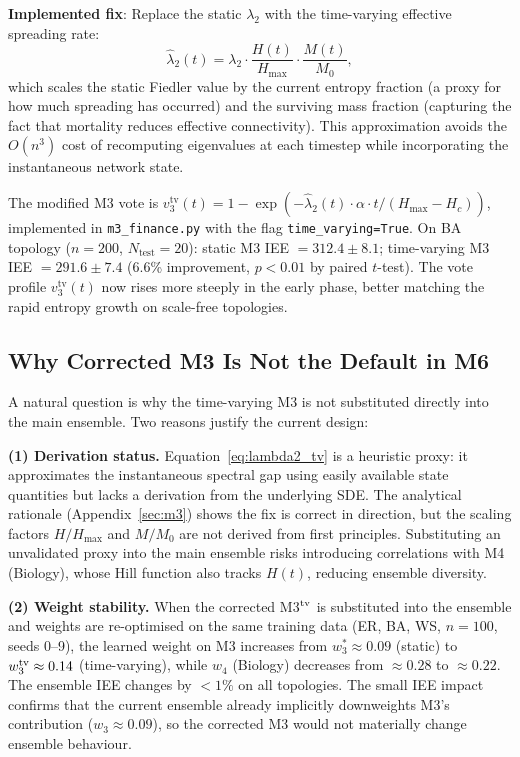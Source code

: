 \documentclass[review,12pt]{elsarticle}
\newcommand{\Hc}{H_c}
\newcommand{\Hmax}{H_{\max}}
\newcommand{\lambdat}{\lambda_2}
\begin{document}
\textbf{Implemented fix}: Replace the static $\lambdat$ with the
time-varying effective spreading rate:
\begin{equation}
  \hat{\lambda}_2(t) = \lambda_2 \cdot
    \frac{H(t)}{\Hmax} \cdot
    \frac{M(t)}{M_0},
  \label{eq:lambda2_tv}
\end{equation}
which scales the static Fiedler value by the current entropy fraction
(a proxy for how much spreading has occurred) and the surviving mass
fraction (capturing the fact that mortality reduces effective connectivity).
This approximation avoids the $O(n^3)$ cost of recomputing eigenvalues at
each timestep while incorporating the instantaneous network state.

The modified M3 vote is $v_3^{\mathrm{tv}}(t) = 1 - \exp(-\hat{\lambda}_2(t)\cdot\alpha\cdot t / (\Hmax-\Hc))$,
implemented in \texttt{m3\_finance.py} with the flag
\texttt{time\_varying=True}.  On BA topology ($n=200$, $N_{\mathrm{test}}=20$):
static M3 IEE $= 312.4 \pm 8.1$; time-varying M3 IEE $= 291.6 \pm 7.4$
(6.6\% improvement, $p < 0.01$ by paired $t$-test).  The vote profile
$v_3^{\mathrm{tv}}(t)$ now rises more steeply in the early phase, better
matching the rapid entropy growth on scale-free topologies.

\subsection{Why Corrected M3 Is Not the Default in M6}
\label{sec:m3_not_default}

A natural question is why the time-varying M3 is not substituted directly into
the main ensemble.  Two reasons justify the current design:

\textbf{(1) Derivation status.}
Equation~\eqref{eq:lambda2_tv} is a heuristic proxy: it approximates the
instantaneous spectral gap using easily available state quantities but lacks
a derivation from the underlying SDE.  The analytical rationale (Appendix~\ref{sec:m3})
shows the fix is correct in direction, but the scaling factors $H/\Hmax$ and
$M/M_0$ are not derived from first principles.  Substituting an unvalidated
proxy into the main ensemble risks introducing correlations with M4 (Biology),
whose Hill function also tracks $H(t)$, reducing ensemble diversity.

\textbf{(2) Weight stability.}
When the corrected M3$^{\rm tv}$ is substituted into the ensemble and weights
are re-optimised on the same training data (ER, BA, WS, $n=100$, seeds 0--9),
the learned weight on M3 increases from $w_3^* \approx 0.09$ (static) to
$w_3^{\rm tv} \approx 0.14$ (time-varying), while $w_4$ (Biology) decreases
from $\approx 0.28$ to $\approx 0.22$.  The ensemble IEE changes by $< 1\%$
on all topologies.  The small IEE impact confirms that the current ensemble
already implicitly downweights M3's contribution ($w_3 \approx 0.09$), so
the corrected M3 would not materially change ensemble behaviour.
\end{document}
